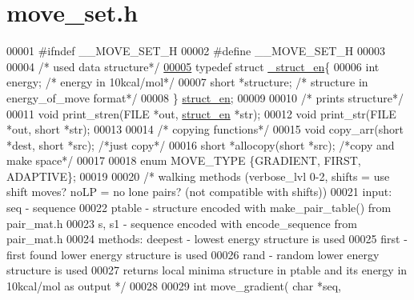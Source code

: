 \hypertarget{move__set_8h_source}{}\section{move\+\_\+set.\+h}
\label{move__set_8h_source}

\begin{DoxyCode}
00001 \textcolor{preprocessor}{#ifndef \_\_MOVE\_SET\_H}
00002 \textcolor{preprocessor}{#define \_\_MOVE\_SET\_H}
00003 
00004 \textcolor{comment}{/* used data structure*/}
\hypertarget{move__set_8h_source_l00005}{}\hyperlink{struct__struct__en}{00005} \textcolor{keyword}{typedef} \textcolor{keyword}{struct }\hyperlink{struct__struct__en}{\_struct\_en}\{
00006   \textcolor{keywordtype}{int} energy;        \textcolor{comment}{/* energy in 10kcal/mol*/}
00007   \textcolor{keywordtype}{short} *structure;  \textcolor{comment}{/* structure in energy\_of\_move format*/}
00008 \} \hyperlink{struct__struct__en}{struct\_en};
00009 
00010 \textcolor{comment}{/* prints structure*/}
00011 \textcolor{keywordtype}{void} print\_stren(FILE *out, \hyperlink{struct__struct__en}{struct\_en} *str);
00012 \textcolor{keywordtype}{void} print\_str(FILE *out, \textcolor{keywordtype}{short} *str);
00013 
00014 \textcolor{comment}{/* copying functions*/}
00015 \textcolor{keywordtype}{void} copy\_arr(\textcolor{keywordtype}{short} *dest, \textcolor{keywordtype}{short} *src); \textcolor{comment}{/*just copy*/}
00016 \textcolor{keywordtype}{short} *allocopy(\textcolor{keywordtype}{short} *src);            \textcolor{comment}{/*copy and make space*/}
00017 
00018 \textcolor{keyword}{enum} MOVE\_TYPE \{GRADIENT, FIRST, ADAPTIVE\};
00019 
00020 \textcolor{comment}{/* walking methods (verbose\_lvl 0-2, shifts = use shift moves? noLP = no lone pairs? (not compatible with
       shifts))}
00021 \textcolor{comment}{    input:    seq - sequence}
00022 \textcolor{comment}{              ptable - structure encoded with make\_pair\_table() from pair\_mat.h}
00023 \textcolor{comment}{              s, s1 - sequence encoded with encode\_sequence from pair\_mat.h}
00024 \textcolor{comment}{    methods:  deepest - lowest energy structure is used}
00025 \textcolor{comment}{              first - first found lower energy structure is used}
00026 \textcolor{comment}{              rand - random lower energy structure is used}
00027 \textcolor{comment}{    returns local minima structure in ptable and its energy in 10kcal/mol as output */}
00028 
00029 \textcolor{keywordtype}{int} move\_gradient( \textcolor{keywordtype}{char} *seq,

\end{DoxyCode}
